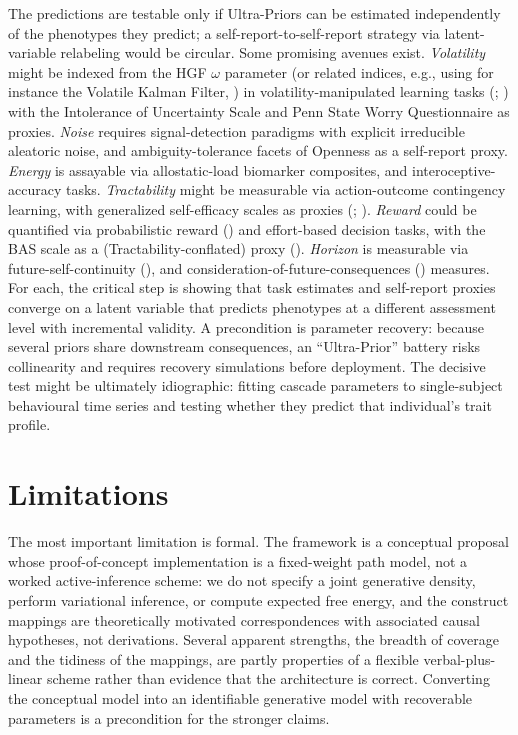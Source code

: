 \documentclass[
  jou,
  floatsintext,
  longtable,
  nolmodern,
  notxfonts,
  notimes,
  12pt,
  colorlinks=true,linkcolor=blue,citecolor=blue,urlcolor=blue]{apa7}
\begin{document}
The predictions are testable only if Ultra-Priors can be estimated
independently of the phenotypes they predict; a
self-report-to-self-report strategy via latent-variable relabeling would
be circular. Some promising avenues exist. \emph{Volatility} might be
indexed from the HGF \(\omega\) parameter (or related indices, e.g.,
using for instance the Volatile Kalman Filter,
) in
volatility-manipulated learning tasks
(;
) with
the Intolerance of Uncertainty Scale and Penn State Worry Questionnaire
as proxies. \emph{Noise} requires signal-detection paradigms with
explicit irreducible aleatoric noise, and ambiguity-tolerance facets of
Openness as a self-report proxy. \emph{Energy} is assayable via
allostatic-load biomarker composites, and interoceptive-accuracy tasks.
\emph{Tractability} might be measurable via action-outcome contingency
learning, with generalized self-efficacy scales as proxies
(;
).
\emph{Reward} could be quantified via probabilistic reward
() and effort-based
decision tasks, with the BAS scale as a (Tractability-conflated) proxy
().
\emph{Horizon} is measurable via future-self-continuity
(), and
consideration-of-future-consequences
()
measures. For each, the critical step is showing that task estimates and
self-report proxies converge on a latent variable that predicts
phenotypes at a different assessment level with incremental validity. A
precondition is parameter recovery: because several priors share
downstream consequences, an ``Ultra-Prior'' battery risks collinearity
and requires recovery simulations before deployment. The decisive test
might be ultimately idiographic: fitting cascade parameters to
single-subject behavioural time series and testing whether they predict
that individual's trait profile.

\section{Limitations}\label{limitations}

The most important limitation is formal. The framework is a conceptual
proposal whose proof-of-concept implementation is a fixed-weight path
model, not a worked active-inference scheme: we do not specify a joint
generative density, perform variational inference, or compute expected
free energy, and the construct mappings are theoretically motivated
correspondences with associated causal hypotheses, not derivations.
Several apparent strengths, the breadth of coverage and the tidiness of
the mappings, are partly properties of a flexible verbal-plus-linear
scheme rather than evidence that the architecture is correct. Converting
the conceptual model into an identifiable generative model with
recoverable parameters is a precondition for the stronger claims.
\end{document}
